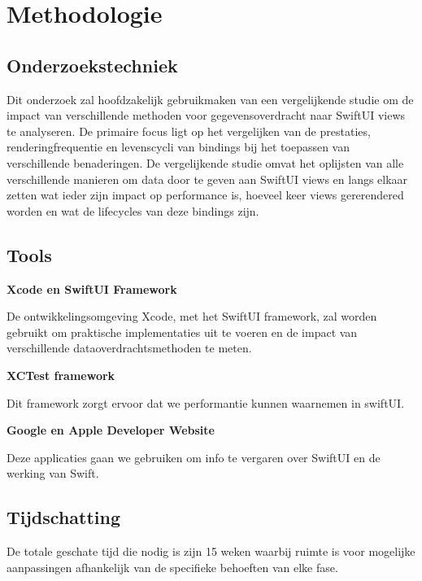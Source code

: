 


\section{Methodologie}%
\label{sec:methodologie}

\subsection{Onderzoekstechniek}
Dit onderzoek zal hoofdzakelijk gebruikmaken van een vergelijkende studie om de impact van verschillende methoden voor gegevensoverdracht naar SwiftUI views te analyseren. De primaire focus ligt op het vergelijken van de prestaties, renderingfrequentie en levenscycli van bindings bij het toepassen van verschillende benaderingen. De vergelijkende studie omvat het oplijsten van alle verschillende manieren om data door te geven aan SwiftUI views en langs elkaar zetten wat ieder zijn impact op performance is, hoeveel keer views gererendered  worden en wat de lifecycles van deze bindings zijn. 

\subsection{Tools}
\textbf{Xcode en SwiftUI Framework}

De ontwikkelingsomgeving Xcode, met het SwiftUI framework, zal worden gebruikt om praktische implementaties uit te voeren en de impact van verschillende dataoverdrachtsmethoden te meten.

\textbf{XCTest framework}

Dit framework zorgt ervoor dat we performantie kunnen waarnemen in swiftUI.

\textbf{Google en Apple Developer Website}

Deze applicaties gaan we gebruiken om info te vergaren over SwiftUI en de werking van Swift.


\subsection{Tijdschatting}
De totale geschate tijd die nodig is zijn 15 weken waarbij ruimte is voor mogelijke aanpassingen afhankelijk van de specifieke behoeften van elke fase.

